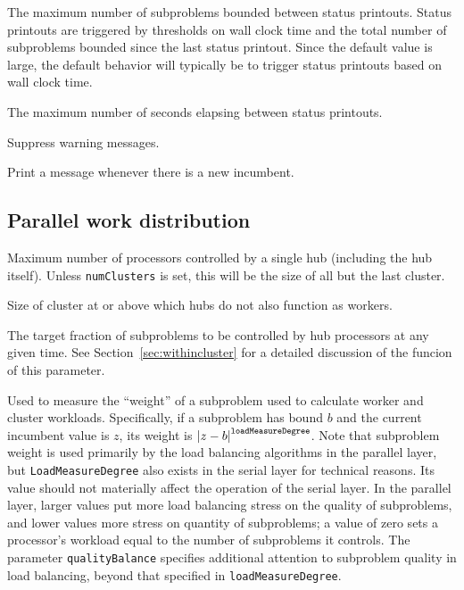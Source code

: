 The maximum number of subproblems bounded between status printouts.
Status printouts are triggered by thresholds on wall clock time and the
total number of subproblems bounded since the last status printout.
Since the default value is large, the default behavior will typically
be to trigger status printouts based on wall clock time.

The maximum number of seconds elapsing between status printouts.

Suppress warning messages.

Print a message whenever there is a new incumbent.

\subsection{Parallel work distribution}
\vspace{-3ex}
Maximum number of processors controlled by a single hub (including the
hub itself).  Unless \texttt{numClusters} is set, this will be the
size of all but the last cluster.

Size of cluster at or above which hubs do not also function as
workers.

The target fraction of subproblems to be controlled by hub
processors at any given time.  See Section~\ref{sec:withincluster} for
a detailed discussion of the funcion of this parameter.

Used to
measure the ``weight'' of a subproblem used to calculate worker and
cluster workloads.  Specifically, if a subproblem has bound $b$ and
the current incumbent value is $z$, its weight is ${\left|z -
b\right|}^{\text{\texttt{loadMeasureDegree}}}$.  Note that subproblem
weight is used primarily by the load balancing algorithms in the
parallel layer, but \texttt{LoadMeasureDegree} also exists in the serial
layer for technical reasons.  
Its value should not materially affect the operation of the serial
layer.  In the parallel layer, larger values put more load balancing
stress on the quality of subproblems, and lower values more stress on
quantity of subproblems; a value of zero sets a processor's workload
equal to the number of subproblems it controls.  The parameter
\texttt{qualityBalance} specifies additional attention to subproblem
quality in load balancing, beyond that specified in
\texttt{loadMeasureDegree}. 
 
